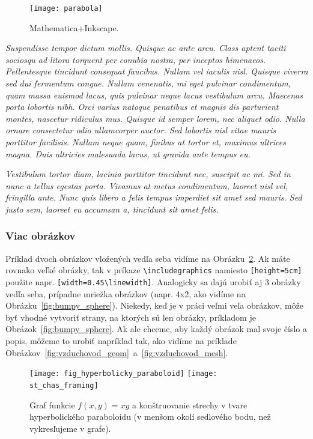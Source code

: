 \begin{figure}
	\centering
	\texttt{[image: parabola]}
	\caption{Mathematica+Inkscape.}
	\label{fig:parabola}
\end{figure}
\textit{Suspendisse tempor dictum mollis. Quisque ac ante arcu. Class aptent taciti sociosqu ad litora torquent per conubia nostra, per inceptos himenaeos. Pellentesque tincidunt consequat faucibus. Nullam vel iaculis nisl. Quisque viverra sed dui fermentum congue. Nullam venenatis, mi eget pulvinar condimentum, quam massa euismod lacus, quis pulvinar neque lacus vestibulum arcu. Maecenas porta lobortis nibh. Orci varius natoque penatibus et magnis dis parturient montes, nascetur ridiculus mus. Quisque id semper lorem, nec aliquet odio. Nulla ornare consectetur odio ullamcorper auctor. Sed lobortis nisl vitae mauris porttitor facilisis. Nullam neque quam, finibus at tortor et, maximus ultrices magna. Duis ultricies malesuada lacus, ut gravida ante tempus eu.}

\textit{Vestibulum tortor diam, lacinia porttitor tincidunt nec, suscipit ac mi. Sed in nunc a tellus egestas porta. Vivamus at metus condimentum, laoreet nisl vel, fringilla ante. Nunc quis libero a felis tempus imperdiet sit amet sed mauris. Sed justo sem, laoreet eu accumsan a, tincidunt sit amet felis.}


\subsubsection{Viac obrázkov}

Príklad dvoch obrázkov vložených vedľa seba vidíme na Obrázku~\ref{fig:hyperbolicky_paraboloid}. Ak máte rovnako veľké obrázky, tak v príkaze \verb|\includegraphics| namiesto \verb|[height=5cm]| použite napr. \verb|[width=0.45\linewidth]|. Analogicky sa dajú urobiť aj 3 obrázky vedľa seba, prípadne mriežka obrázkov (napr. 4x2, ako vidíme na Obrázku~\ref{fig:bumpy_sphere}). Niekedy, keď je v práci veľmi veľa obrázkov, môže byť vhodné vytvoriť strany, na ktorých sú len obrázky, príkladom je Obrázok~\ref{fig:bumpy_sphere}. Ak ale chceme, aby každý obrázok mal svoje číslo a popis, môžeme to urobiť napríklad tak, ako vidíme na príklade Obrázkov~\ref{fig:vzduchovod_geom}~a~\ref{fig:vzduchovod_mesh}.
\begin{figure}[!h]
	\centering
	\texttt{[image: fig\_hyperbolicky\_paraboloid]}
	\quad
	\texttt{[image: st\_chas\_framing]}
	\caption{Graf funkcie $f(x,y)=xy$ a konštruovanie strechy v tvare hyperbolického paraboloidu (v menšom okolí sedlového bodu, než vykresľujeme v grafe).} \label{fig:hyperbolicky_paraboloid}
\end{figure}

